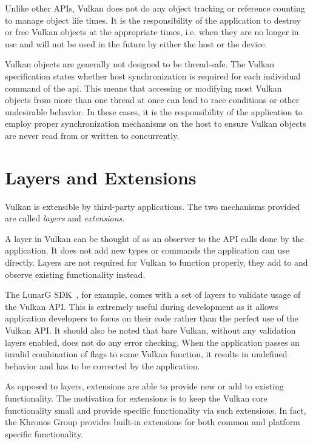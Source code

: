     Unlike other APIs, Vulkan does not do any object tracking or reference counting to manage object life times.
    It is the responsibility of the application to destroy or free Vulkan objects at the appropriate times, i.e.
    when they are no longer in use and will not be used in the future by either the host or the device.

    Vulkan objects are generally not designed to be thread-safe.
    The Vulkan specification states whether host synchronization is required for each individual command of the \gls{api}.
    This means that accessing or modifying most Vulkan objects from more than one thread at once can lead to race conditions or other undesirable behavior.
    In these cases, it is the responsibility of the application to employ proper synchronization mechanisms on the host to ensure Vulkan objects are never read from or written to concurrently.

  \section{Layers and Extensions}
  \label{sec:LayersAndExtensions}
    Vulkan is extensible by third-party applications.
    The two mechanisms provided are called \textit{layers} and \textit{extensions}.

    A layer in Vulkan can be thought of as an observer to the API calls done by the application.
    It does not add new types or commands the application can use directly.
    Layers are not required for Vulkan to function properly, they add to and observe existing functionality instead.

    The LunarG SDK~\cite{lunargvulkansdk}, for example, comes with a set of layers to validate usage of the Vulkan API.
    This is extremely useful during development as it allows application developers to focus on their code rather than the perfect use of the Vulkan API.
    It should also be noted that bare Vulkan, without any validation layers enabled, does not do any error checking.
    When the application passes an invalid combination of flags to some Vulkan function, it results in undefined behavior and has to be corrected by the application.

    As opposed to layers, extensions are able to provide new or add to existing functionality. The motivation for extensions is to keep the Vulkan core functionality small and provide specific functionality via such extensions. In fact, the Khronos Group provides built-in extensions for both common and platform specific functionality.

